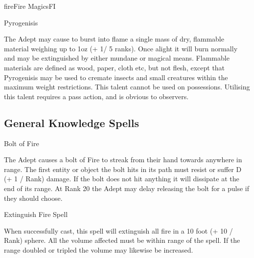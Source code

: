 \begin{college}[2.0]{fire}{Fire Magics}{FI}
\begin{talent}[T-2]{Pyrogenisis}
\begin{effects}
The Adept may cause to burst into flame a single mass of dry,
flammable material weighing up to 1oz (+ 1/ 5 ranks). Once alight it
will burn normally and may be extinguished by either mundane or
magical means. Flammable materials are defined as wood, paper, cloth
etc, but not flesh, except that Pyrogenisis may be used to cremate
insects and small creatures within the maximum weight restrictions.
This talent cannot be used on possessions. Utilising this talent
requires a pass action, and is obvious to observers.
\end{effects}
\end{talent}

\subsection{General Knowledge Spells}

\begin{spell}[G-1]{Bolt of Fire}
\begin{effects}
The Adept causes a bolt of Fire to streak from their hand towards
anywhere in range. The first entity or object the bolt hits in its
path must resist or suffer D (+ 1 / Rank) damage.  If the bolt does
not hit anything it will dissipate at the end of its range. At Rank 20
the Adept may delay releasing the bolt for a pulse if they should
choose.
\end{effects}
\end{spell}

\begin{spell}[G-2]{Extinguish Fire Spell}
\begin{effects}
When successfully cast, this spell will extinguish all fire in a 10
foot (+ 10 / Rank) sphere. All the volume affected must be within
range of the spell. If the range doubled or tripled the volume may
likewise be increased.
\end{effects}
\end{spell}


\end{college}
